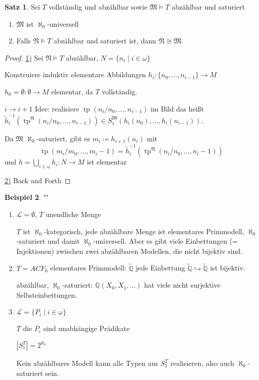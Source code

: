 \documentclass[12pt,parskip=full]{scrartcl}
\newcommand{\setQ}{\mathbb{Q}}
\newcommand{\abs}[1]{{\left| #1 \right|}}
\newcommand{\heading}{\underline}
\theoremstyle{definition}
\newtheorem{theorem}{Satz}[section]
\newtheorem{example}[theorem]{Beispiel}
\begin{document}
	\begin{theorem}
		Sei $T$ vollständig und abzählbar sowie $\mathfrak{M} \models T$ abzählbar und saturiert
		\begin{enumerate}
			\item $\mathfrak{M}$ ist $\aleph_0$-universell
			\item Falls $\mathfrak{N} \models T$ abzählbar und saturiert ist, dann $\mathfrak{N} \cong \mathfrak{M}$.
		\end{enumerate}
	\end{theorem}

	\begin{proof}
		\heading{1)} Sei $\mathfrak{N} \models T$ abzählbar, $N = \{ n_i \mid i \in \omega \}$
		
		Konstruiere induktiv elementare Abbildungen $h_i: \{ n_0, \dots, n_{i-1} \} \to M$
		
		$h_0 = \emptyset: \emptyset \to M$ elementar, da $T$ vollständig.
		
		$i \to i+1$ Idee: realisiere $\operatorname{tp}(n_i/ n_0, \dots, n_{i-1})$ im Bild das heißt $\tilde{h}^{-1}_i(\operatorname{tp}^\mathfrak{N}(n_i / n_0, \dots, n_{i-1})) \in S_1^\mathfrak{M}(h_i(n_0), \dots, h_i(n_{i-1}))$.
		
		Da $\mathfrak{M}$ $\aleph_0$-saturiert, gibt es $m_i \coloneqq h_{i+1}(n_i)$ mit
		\begin{equation*}
			\operatorname{tp}(m_i / m_0, \dots, m_i-1) = \tilde{h}_i^{-1}(\operatorname{tp}^\mathfrak{N}(n_i / n_0, \dots, n_i-1))
		\end{equation*}
		und $h = \bigcup_{i \in \omega} h_i: N \to M$ ist elementar
		
		\heading{2)} Back and Forth
	\end{proof}
	
	\begin{example}""
		
		\begin{enumerate}
			\item $\mathcal{L} = \emptyset$, $T$ unendliche Menge
			
			$T$ ist $\aleph_0$-kategorisch, jede abzählbare Menge ist elementares Primmodell, $\aleph_0$-saturiert und damit $\aleph_0$-universell. Aber es gibt viele Einbettungen (= Injektionen) zwischen zwei abzählbaren Modellen, die nicht bijektiv sind.
			
			\item $T = ACF_0$ elementares Primmodell: $\tilde{\setQ}$ jede Einbettung $\tilde{\setQ} \hookrightarrow \tilde{\setQ}$ ist bijektiv.
			
			abzählbar, $\aleph_0$-saturiert: $\overline{\setQ(X_0, X_1, \dots )}$ hat viele nicht surjektive Selbsteinbettungen.
			
			\item $\mathcal{L} = \{ P_i \mid i \in \omega \}$
			
			$T$ die $P_i$ sind unabhängige Prädikate
			
			$\abs{S_1^T} = 2^{\aleph_0}$
			
			Kein abzählbares Modell kann alle Typen aus $S_1^T$ realisieren, also auch $\aleph_0$-saturiert sein.
		\end{enumerate}
	\end{example}
\end{document}
